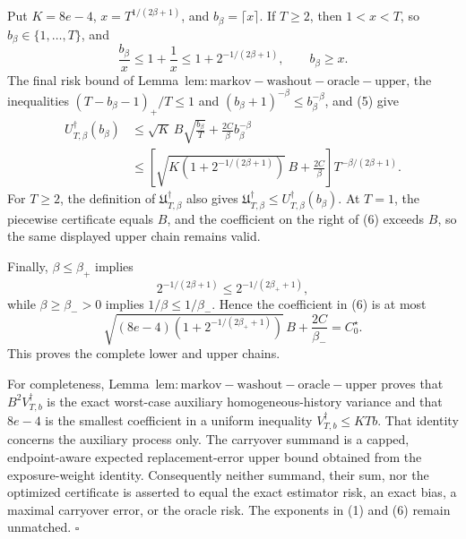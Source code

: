 Put \(K=8e-4\), \(x=T^{1/(2\beta+1)}\), and \(b_\beta=\lceil x\rceil\). If \(T\ge2\), then \(1<x<T\), so \(b_\beta\in\{1,\ldots,T\}\), and
\[
\frac{b_\beta}{x}\le1+\frac1x\le1+2^{-1/(2\beta+1)},
\qquad b_\beta\ge x.
\tag{5}
\]
The final risk bound of Lemma~\(\mathrm{lem:markov-washout-oracle-upper}\), the inequalities \((T-b_\beta-1)_+/T\le1\) and \((b_\beta+1)^{-\beta}\le b_\beta^{-\beta}\), and (5) give
\[
\begin{aligned}
U_{T,\beta}^{\dagger}(b_\beta)
&\le \sqrt K\,B\sqrt{\frac{b_\beta}{T}}+\frac{2C}{\beta}b_\beta^{-\beta}\\
&\le\left[\sqrt{K\left(1+2^{-1/(2\beta+1)}\right)}\,B+\frac{2C}{\beta}\right]T^{-\beta/(2\beta+1)}.
\end{aligned}
\tag{6}
\]
For \(T\ge2\), the definition of \(\mathfrak U_{T,\beta}^{\dagger}\) also gives \(\mathfrak U_{T,\beta}^{\dagger}\le U_{T,\beta}^{\dagger}(b_\beta)\). At \(T=1\), the piecewise certificate equals \(B\), and the coefficient on the right of (6) exceeds \(B\), so the same displayed upper chain remains valid.

Finally, \(\beta\le\beta_+\) implies
\[
2^{-1/(2\beta+1)}\le2^{-1/(2\beta_++1)},
\]
while \(\beta\ge\beta_->0\) implies \(1/\beta\le1/\beta_-\). Hence the coefficient in (6) is at most
\[
\sqrt{(8e-4)\left(1+2^{-1/(2\beta_++1)}\right)}\,B+\frac{2C}{\beta_-}=C_0^\star.
\]
This proves the complete lower and upper chains.

For completeness, Lemma~\(\mathrm{lem:markov-washout-oracle-upper}\) proves that \(B^2V_{T,b}^{\dagger}\) is the exact worst-case auxiliary homogeneous-history variance and that \(8e-4\) is the smallest coefficient in a uniform inequality \(V_{T,b}^{\dagger}\le KTb\). That identity concerns the auxiliary process only. The carryover summand is a capped, endpoint-aware expected replacement-error upper bound obtained from the exposure-weight identity. Consequently neither summand, their sum, nor the optimized certificate is asserted to equal the exact estimator risk, an exact bias, a maximal carryover error, or the oracle risk. The exponents in (1) and (6) remain unmatched. \(\square\)